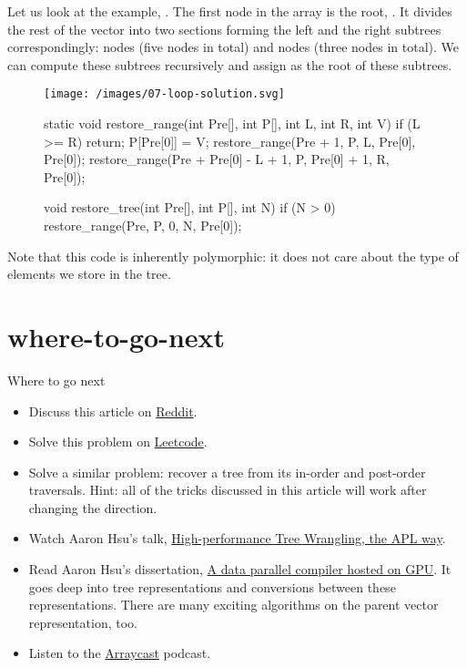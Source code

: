 \documentclass{article}
\begin{document}
Let us look at the example, .
The first node in the array is the root, .
It divides the rest of the vector into two sections forming the left and the right subtrees correspondingly: nodes  (five nodes in total) and nodes  (three nodes in total).
We can compute these subtrees recursively and assign  as the root of these subtrees.

\begin{figure}[grayscale-diagram]
  \texttt{[image: /images/07-loop-solution.svg]}
\end{figure}
\begin{figure}
\begin{code}[c]
static void restore_range(int Pre[], int P[], int L, int R, int V) {
    if (L >= R) return;
    P[Pre[0]] = V;
    restore_range(Pre + 1, P, L, Pre[0], Pre[0]);
    restore_range(Pre + Pre[0] - L + 1, P, Pre[0] + 1, R, Pre[0]);
}

void restore_tree(int Pre[], int P[], int N) {
    if (N > 0) restore_range(Pre, P, 0, N, Pre[0]);
}
\end{code}
\end{figure}

Note that this code is inherently polymorphic: it does not care about the type of elements we store in the tree.

\section{where-to-go-next}{Where to go next}
\begin{itemize}
  \item Discuss this article on \href{https://www.reddit.com/r/apljk/comments/v5cr09/blog_post_square_joy_preorder/}{Reddit}.
  \item Solve this problem on \href{https://leetcode.com/problems/construct-binary-tree-from-preorder-and-inorder-traversal/}{Leetcode}.
  \item
    Solve a similar problem: recover a tree from its in-order and post-order traversals.
    Hint: all of the tricks discussed in this article will work after changing the direction.
  \item Watch Aaron Hsu's talk, \href{https://www.youtube.com/watch?v=hzPd3umu78g}{High-performance Tree Wrangling, the APL way}.
  \item Read Aaron Hsu's dissertation, \href{https://scholarworks.iu.edu/dspace/handle/2022/24749}{A data parallel compiler hosted on GPU}.
    It goes deep into tree representations and conversions between these representations.
    There are many exciting algorithms on the parent vector representation, too.
  \item Listen to the \href{https://arraycast.com/}{Arraycast} podcast.
\end{itemize}
\end{document}
